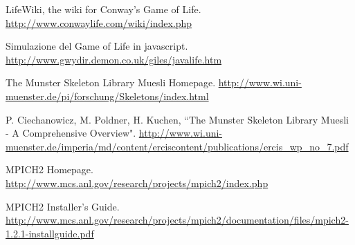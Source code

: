 \begin{thebibliography}{100}

   LifeWiki, the wiki for Conway's Game of Life. \url{http://www.conwaylife.com/wiki/index.php}

   Simulazione del Game of Life in javascript. \url{http://www.gwydir.demon.co.uk/giles/javalife.htm}

   The Munster Skeleton Library Muesli Homepage. \url{http://www.wi.uni-muenster.de/pi/forschung/Skeletons/index.html}

   P. Ciechanowicz, M. Poldner, H. Kuchen, ``The Munster Skeleton Library Muesli - A Comprehensive Overview". \url{http://www.wi.uni-muenster.de/imperia/md/content/erciscontent/publications/ercis_wp_no_7.pdf}

   MPICH2 Homepage. \url{http://www.mcs.anl.gov/research/projects/mpich2/index.php}
  
   MPICH2 Installer's Guide. \url{http://www.mcs.anl.gov/research/projects/mpich2/documentation/files/mpich2-1.2.1-installguide.pdf}

\end{thebibliography}

